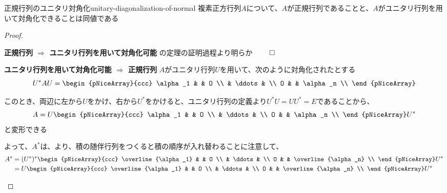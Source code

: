 \documentclass[../../../topic_linear-algebra]{subfiles}
\begin{document}
\begin{theorem}{正規行列のユニタリ対角化}{unitary-diagonalization-of-normal}
  複素正方行列$A$について、$A$が正規行列であることと、$A$がユニタリ行列を用いて対角化できることは同値である
\end{theorem}

\begin{proof}
  \begin{subpattern}{\bfseries 正規行列 $\Longrightarrow$ ユニタリ行列を用いて対角化可能}
    の定理の証明過程より明らか $\qed$
  \end{subpattern}

  \begin{subpattern}{\bfseries ユニタリ行列を用いて対角化可能 $\Longrightarrow$ 正規行列}
    $A$がユニタリ行列$U$を用いて、次のように対角化されたとする
    \begin{equation*}
      U^* AU =  \begin{pNiceArray}{ccc}
        \alpha_1 & & O \\
        &  \ddots & \\
        O & & \alpha_n \\
      \end{pNiceArray}
    \end{equation*}

    このとき、両辺に左から$U$をかけ、右から$U^*$をかけると、ユニタリ行列の定義より$U^*U = UU^* = E$であることから、
    \begin{equation*}
      A = U \begin{pNiceArray}{ccc}
        \alpha_1 & & O \\
        &  \ddots & \\
        O & & \alpha_n \\
      \end{pNiceArray} U^*
    \end{equation*}
    と変形できる

    \br

    よって、$A^*$は、より、積の随伴行列をつくると積の順序が入れ替わることに注意して、
    \begin{align*}
      A^* & = (U^*)^* \begin{pNiceArray}{ccc}
                        \overline{\alpha_1} & & O \\
                        &  \ddots & \\
                        O & & \overline{\alpha_n} \\
                      \end{pNiceArray} U^* \\
          & = U \begin{pNiceArray}{ccc}
                  \overline{\alpha_1} & & O \\
                  &  \ddots & \\
                  O & & \overline{\alpha_n} \\
                \end{pNiceArray} U^*
    \end{align*}


\end{subpattern}
\end{proof}
\end{document}
